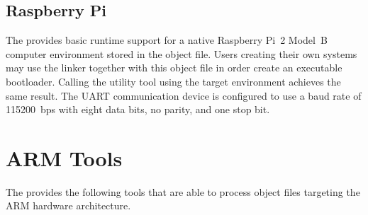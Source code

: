 \subsection{Raspberry Pi}

The \ecs{} provides basic runtime support for a native Raspberry Pi~2 Model~B computer environment stored in the  object file.
Users creating their own systems may use the  linker together with this object file in order create an executable bootloader.
Calling the  utility tool using the  target environment achieves the same result.
The UART communication device is configured to use a baud rate of 115200~bps with eight data bits, no parity, and one stop bit.

\section{ARM Tools}

The \ecs{} provides the following tools that are able to process object files targeting the ARM hardware architecture.
\interface

\cdarma
\cdarmb
\cdarmc
\cdarmcfpe
\cpparma
\cpparmb
\cpparmc
\cpparmcfpe
\falarma
\falarmb
\falarmc
\falarmcfpe
\obarma
\obarmb
\obarmc
\obarmcfpe
\armaasm
\armbasm
\armcasm
\armadism
\armbdism
\armcdism
\linkbin
\linkmem

\concludechapter
